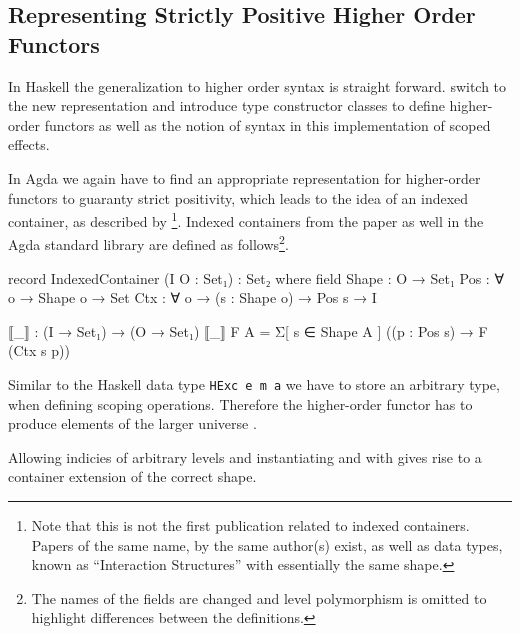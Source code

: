 \subsection{Representing Strictly Positive Higher Order Functors}
\label{higher-order:container}

In Haskell the generalization to higher order syntax is straight forward.
\textcite{DBLP:conf/haskell/WuSH14} switch to the new representation and
introduce type constructor classes to define higher-order functors as well as
the notion of syntax in this implementation of scoped effects.

In Agda we again have to find an appropriate representation for higher-order
functors to guaranty strict positivity, which leads to the idea of an indexed
container, as described by \textcite{DBLP:journals/jfp/AltenkirchGHMM15}
\footnote{Note that this is not the first publication related to indexed
  containers. Papers of the same name, by the same author(s) exist, as well as
  data types, known as ``Interaction Structures'' with essentially the same
  shape.}. 
Indexed containers from the paper as well in the Agda standard library are
defined as follows\footnote{The names of the fields are changed and level
  polymorphism is omitted to highlight differences between the definitions.}.

\begin{code}
record IndexedContainer (I O : Set₁) : Set₂ where
  field
    Shape : O → Set₁
    Pos : ∀ {o} → Shape o → Set
    Ctx : ∀ {o} → (s : Shape o) → Pos s → I

  ⟦_⟧ : (I → Set₁) → (O → Set₁)
  ⟦_⟧ F A = Σ[ s ∈ Shape A ] ((p : Pos s) → F (Ctx s p))
\end{code}
Similar to the Haskell data type \texttt{HExc e m a} we
have to store an arbitrary type, when defining scoping operations.
Therefore the higher-order functor has to produce elements of the larger
universe .

Allowing indicies of arbitrary levels and instantiating  and
 with  gives rise to a container extension
of the correct shape.

